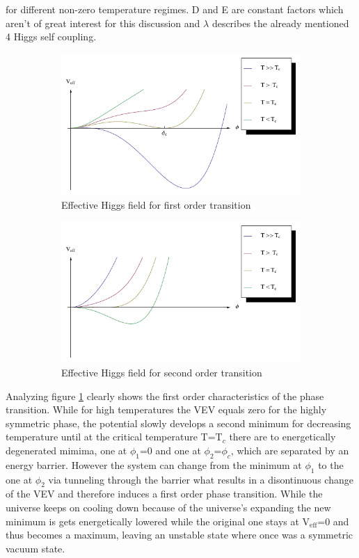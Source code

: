 for different non-zero temperature regimes. D and E are constant factors which aren't of great interest for this discussion and $\lambda$ describes the already mentioned 4 Higgs self coupling.
\begin{figure}[H]
	\centering
	\begin{subfigure}{0.49\textwidth}
		\includegraphics[width=\linewidth]{Images/Higgs1}
		\caption{Effective Higgs field for first order transition}
		\label{fig:higgs1}	
	\end{subfigure}
	\begin{subfigure}{0.49\textwidth}
		\includegraphics[width=\linewidth]{Images/Higgs2}
		\caption{Effective Higgs field for second order transition}
		\label{fig:higgs2}
	\end{subfigure}
	\caption{}
	\label{fig:higgs}
\end{figure}
Analyzing figure \ref{fig:higgs1} clearly shows the first order characteristics of the phase transition. While for high temperatures the VEV equals zero for the highly symmetric phase, the potential slowly develops a second minimum for decreasing temperature until at the critical temperature T=T$_c$ there are to energetically degenerated mimima, one at $\phi_1$=0 and one at $\phi_2$=$\phi_c$, which are separated by an energy barrier. However the system can change from the minimum at $\phi_1$ to the one at $\phi_2$ via tunneling through the barrier what results in a disontinuous change of the VEV and therefore induces a first order phase transition. While the universe keeps on cooling down because of the universe's expanding the new minimum is gets energetically lowered while the original one stays at V$_\text{eff}$=0 and thus becomes a maximum, leaving an unstable state where once was a symmetric vacuum state. \newline
